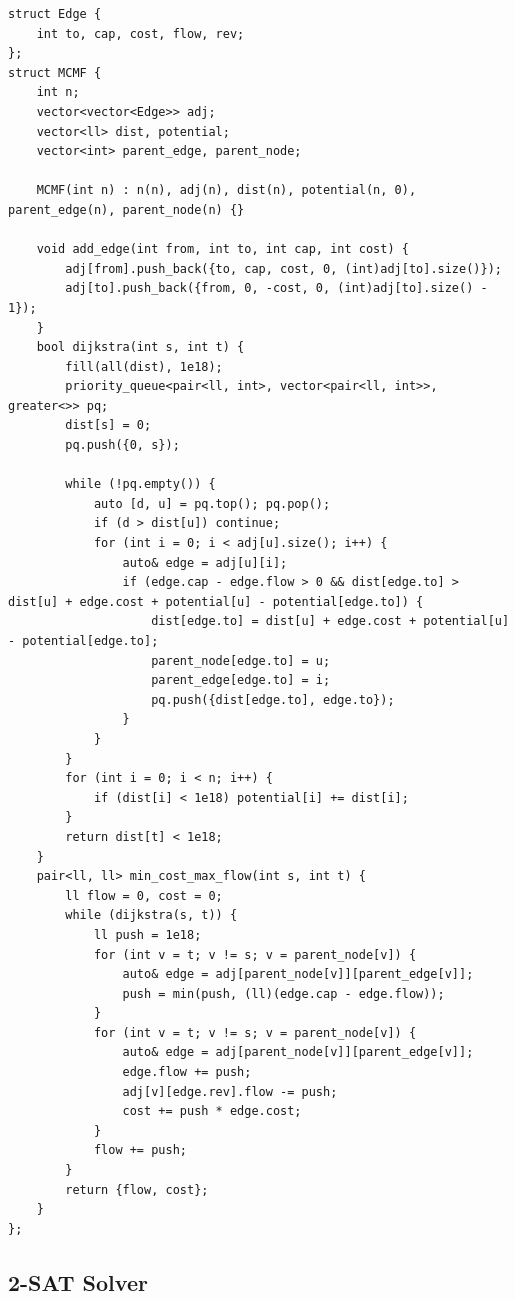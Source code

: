 \begin{lstlisting}
struct Edge {
    int to, cap, cost, flow, rev;
};
struct MCMF {
    int n;
    vector<vector<Edge>> adj;
    vector<ll> dist, potential;
    vector<int> parent_edge, parent_node;

    MCMF(int n) : n(n), adj(n), dist(n), potential(n, 0), parent_edge(n), parent_node(n) {}

    void add_edge(int from, int to, int cap, int cost) {
        adj[from].push_back({to, cap, cost, 0, (int)adj[to].size()});
        adj[to].push_back({from, 0, -cost, 0, (int)adj[to].size() - 1});
    }
    bool dijkstra(int s, int t) {
        fill(all(dist), 1e18);
        priority_queue<pair<ll, int>, vector<pair<ll, int>>, greater<>> pq;
        dist[s] = 0;
        pq.push({0, s});

        while (!pq.empty()) {
            auto [d, u] = pq.top(); pq.pop();
            if (d > dist[u]) continue;
            for (int i = 0; i < adj[u].size(); i++) {
                auto& edge = adj[u][i];
                if (edge.cap - edge.flow > 0 && dist[edge.to] > dist[u] + edge.cost + potential[u] - potential[edge.to]) {
                    dist[edge.to] = dist[u] + edge.cost + potential[u] - potential[edge.to];
                    parent_node[edge.to] = u;
                    parent_edge[edge.to] = i;
                    pq.push({dist[edge.to], edge.to});
                }
            }
        }
        for (int i = 0; i < n; i++) {
            if (dist[i] < 1e18) potential[i] += dist[i];
        }
        return dist[t] < 1e18;
    }
    pair<ll, ll> min_cost_max_flow(int s, int t) {
        ll flow = 0, cost = 0;
        while (dijkstra(s, t)) {
            ll push = 1e18;
            for (int v = t; v != s; v = parent_node[v]) {
                auto& edge = adj[parent_node[v]][parent_edge[v]];
                push = min(push, (ll)(edge.cap - edge.flow));
            }
            for (int v = t; v != s; v = parent_node[v]) {
                auto& edge = adj[parent_node[v]][parent_edge[v]];
                edge.flow += push;
                adj[v][edge.rev].flow -= push;
                cost += push * edge.cost;
            }
            flow += push;
        }
        return {flow, cost};
    }
};
\end{lstlisting}


\subsection{2-SAT Solver}

